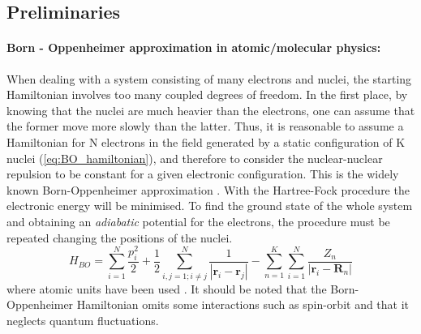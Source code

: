\subsection{Preliminaries}\label{preliminaries}
\paragraph{Born - Oppenheimer approximation in atomic/molecular physics:}
When dealing with a system consisting of many electrons and nuclei, the starting Hamiltonian involves too many coupled degrees of freedom. In the first place, by knowing that the nuclei are much heavier than the electrons, one can assume that the former move more slowly than the latter. Thus, it is reasonable to assume a Hamiltonian for N electrons in the field generated by a static configuration of K nuclei (\ref{eq:BO_hamiltonian}), and therefore to consider the nuclear-nuclear repulsion to be constant for a given electronic configuration. This is the widely known Born-Oppenheimer approximation \cite{sutcliffe}. %
With the Hartree-Fock procedure the electronic energy will be minimised. To find the ground state of the whole system and obtaining an \emph{adiabatic} potential for the electrons, the procedure must be repeated changing the positions of the nuclei.%
\begin{equation}
    H_{BO} =\sum_{i=1}^N\frac{p_i^2}{2}+
    \frac{1}{2} \sum_{i,j=1;i\neq j}^N \frac{1}{\left|\mathbf{r}_i -\mathbf{r}_j\right|} - 
    \sum_{n=1}^K\sum_{i=1}^N \frac{Z_n}{\left|\mathbf{r}_i -\mathbf{R}_n\right|}
    \label{eq:BO_hamiltonian}
\end{equation}
where atomic units have been used \cite{szabo}. It should be noted that the Born-Oppenheimer Hamiltonian omits some interactions such as spin-orbit and that it neglects quantum fluctuations.
